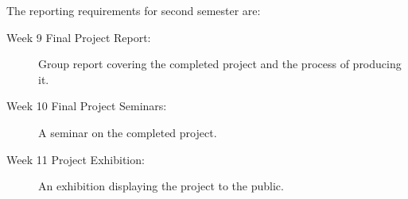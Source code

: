 The reporting requirements for second semester are:
\begin{description}
\item[Week 9 Final Project Report:] Group report covering the completed project and the process of producing it.
\item[Week 10 Final Project Seminars:] A seminar on the completed project.  
\item[Week 11 Project Exhibition:] An exhibition displaying the project to the public.
\end{description}

